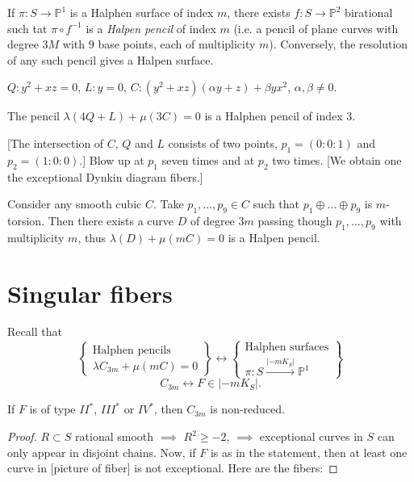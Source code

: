 \begin{proposition}
\label{proposition-halphen}
If $\pi:S \to \mathbb{P}^1$
is a Halphen surface
of index $m$, there exists $f:S \to
\mathbb{P}^2$
birational such tat $\pi \circ f^{-1}$ is a
{\it Halpen pencil}
of index $m$
(i.e. a pencil of plane curves
with degree $3M$ with 9 base points,
each of multiplicity $m$).
Conversely, the resolution
of any such pencil gives a Halpen surface.
\end{proposition}

\begin{example}
\label{example-halphen}
$Q:y^2+xz=0$,
$L:y=0$,
$C:(y^2+xz)(\alpha y+z)+\beta yx^2$,
$\alpha,\beta \neq 0$.

The pencil $\lambda(4Q+L)+\mu(3C)=0$
is a Halphen pencil of index 3.

[The intersection of $C$, $Q$ and $L$
consists of two points,
$p_1=(0:0:1)$ and $p_2=(1:0:0)$.]
Blow up at $p_1$ seven times
and at $p_2$ two times.
[We obtain one the exceptional Dynkin diagram
fibers.]
\end{example}

\begin{example}
\label{example-halpen2}
Consider any smooth cubic $C$.
Take $p_1,…,p_9 \in C$ such that
$p_1 \oplus … \oplus p_9$ is $m$-torsion.
Then there exists a curve $D$ of degree $3m$
passing
though $p_1,…,p_9$ with multiplicity $m$,
thus $\lambda(D)+\mu(mC)=0$ is a Halpen
pencil.
\end{example}

\section{Singular fibers}
\label{section-singular-fibers}

Recall that
$$
\left\{\substack{\text{Halphen pencils} \\
\text{$\lambda C_{3m}+\mu(mC)=0$}}\right\}
\leftrightarrow
\left\{\substack{
\text{Halphen surfaces} \\
\pi:S \xrightarrow{|-m
K_S|}\mathbb{P}^1}\right\}
$$
$$
C_{3m}\leftrightarrow F\in |-m K_S|.
$$

\begin{proposition}[Z]
\label{proposition-singular-fibers}
If $F$ is of type $II^*$, $III^*$ or  $IV^*$,
then $C_{3m}$ is non-reduced.
\end{proposition}

\begin{proof}
$R\subset S$ rational smooth $\implies $ $R^2
\geq  -2$,
$\implies $ exceptional curves in $S$ can
only appear
in disjoint chains.
Now, if $F$ is as in the statement,
then at least one curve in [picture of fiber]
is not exceptional.
Here are the fibers:
\end{proof}

